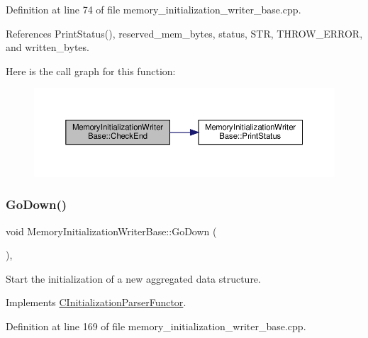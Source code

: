 Definition at line 74 of file memory\+\_\+initialization\+\_\+writer\+\_\+base.\+cpp.



References Print\+Status(), reserved\+\_\+mem\+\_\+bytes, status, S\+TR, T\+H\+R\+O\+W\+\_\+\+E\+R\+R\+OR, and written\+\_\+bytes.

Here is the call graph for this function\+:
\nopagebreak
\begin{figure}[H]
\begin{center}
\leavevmode
\includegraphics[width=350pt]{d3/d26/classMemoryInitializationWriterBase_a33b7ee7cf9c476b02a3f6fb1e6e22a25_cgraph}
\end{center}
\end{figure}
\mbox{\label{classMemoryInitializationWriterBase_a3ad046983ce9cfe765bcccb7ea16f47f}} 
\subsubsection{\texorpdfstring{Go\+Down()}{GoDown()}}
{\footnotesize\ttfamily void Memory\+Initialization\+Writer\+Base\+::\+Go\+Down (\begin{DoxyParamCaption}{ }\end{DoxyParamCaption})\hspace{0.3cm}{\ttfamily [override]}, {\ttfamily [virtual]}}



Start the initialization of a new aggregated data structure. 



Implements \hyperlink{classCInitializationParserFunctor_acd23f951887db083c2c02d4e0865e260}{C\+Initialization\+Parser\+Functor}.



Definition at line 169 of file memory\+\_\+initialization\+\_\+writer\+\_\+base.\+cpp.



